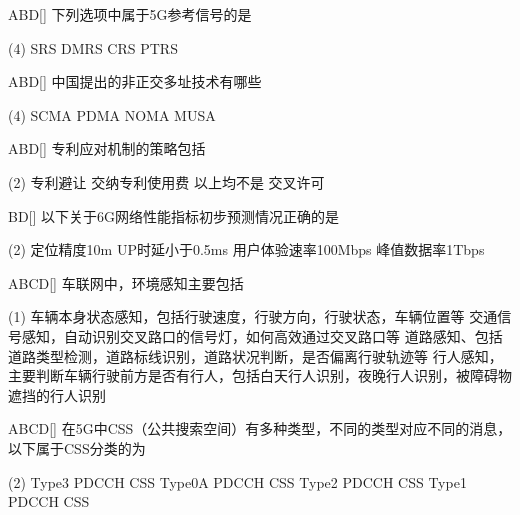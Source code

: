 \begin{choice}{\;ABD\;}[]
    下列选项中属于5G参考信号的是
    \begin{tasks}(4)
        \task SRS
        \task DMRS
        \task CRS
        \task PTRS
    \end{tasks}
\end{choice}


\begin{choice}{\;ABD\;}[]
    中国提出的非正交多址技术有哪些
    \begin{tasks}(4)
        \task SCMA
        \task   PDMA
        \task NOMA
        \task MUSA
    \end{tasks}
\end{choice}

\begin{choice}{\;ABD\;}[]
    专利应对机制的策略包括
    \begin{tasks}(2)
        \task 专利避让
        \task 交纳专利使用费
        \task 以上均不是
        \task 交叉许可
    \end{tasks}
\end{choice}

\begin{choice}{\;BD\;}[]
    以下关于6G网络性能指标初步预测情况正确的是
    \begin{tasks}(2)
        \task 定位精度10m
        \task UP时延小于0.5ms
        \task 用户体验速率100Mbps
        \task 峰值数据率1Tbps
    \end{tasks}
\end{choice}


\begin{choice}{\;ABCD\;}[]
    车联网中，环境感知主要包括
    \begin{tasks}(1)
        \task 车辆本身状态感知，包括行驶速度，行驶方向，行驶状态，车辆位置等
        \task 交通信号感知，自动识别交叉路口的信号灯，如何高效通过交叉路口等
        \task 道路感知、包括道路类型检测，道路标线识别，道路状况判断，是否偏离行驶轨迹等
        \task 行人感知，主要判断车辆行驶前方是否有行人，包括白天行人识别，夜晚行人识别，被障碍物遮挡的行人识别
    \end{tasks}
\end{choice}


\begin{choice}{\;ABCD\;}[]
    在5G中CSS（公共搜索空间）有多种类型，不同的类型对应不同的消息，以下属于CSS分类的为
    \begin{tasks}(2)
        \task Type3 PDCCH CSS
        \task Type0A PDCCH CSS
        \task Type2 PDCCH CSS
        \task Type1 PDCCH CSS
    \end{tasks}
\end{choice}


